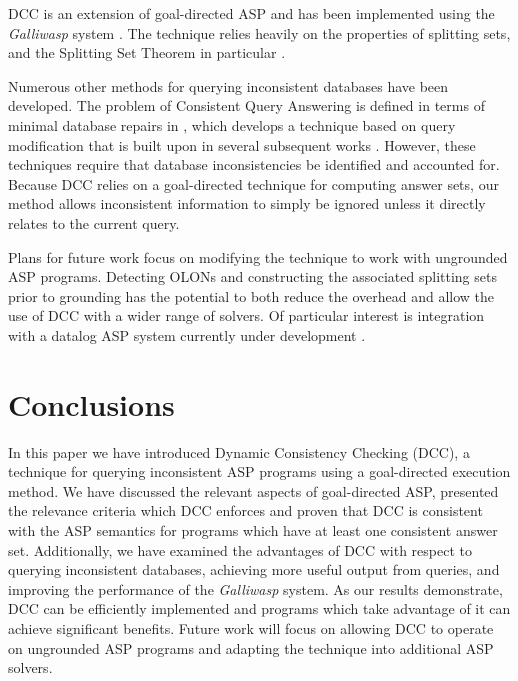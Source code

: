\documentclass{new_tlp}
\begin{document}
DCC is an extension of goal-directed ASP \cite{goalasp} and has been implemented
using the \textit{Galliwasp} system \cite{galliwasp}. The technique relies 
heavily on the properties of splitting sets, and the Splitting Set Theorem in 
particular \cite{splitting}.

Numerous other methods for querying inconsistent databases have been developed. 
The problem of Consistent Query Answering is defined in terms of minimal 
database repairs in \cite{arenas1999}, which develops a technique based on 
query modification that is built upon in several subsequent works 
\cite{celle2000,arenas2003}. 
However, these techniques require that database inconsistencies be identified 
and accounted for. Because DCC relies on a goal-directed technique for 
computing answer sets, our method allows inconsistent information to simply be 
ignored unless it directly relates to the current query.

Plans for future work focus on modifying the technique to work with ungrounded 
ASP programs. Detecting OLONs and constructing the associated splitting sets 
prior to grounding has the potential to both reduce the overhead and allow the 
use of DCC with a wider range of solvers. Of particular interest is integration 
with a datalog ASP system currently under development \cite{elmer}.


\section{Conclusions} \label{sec:conclusions}

In this paper we have introduced Dynamic Consistency Checking (DCC), a 
technique for querying inconsistent ASP programs using a goal-directed 
execution method. We have discussed the relevant aspects of goal-directed ASP, 
presented the relevance criteria which DCC enforces and proven that DCC is 
consistent with the ASP semantics for programs which have at least one 
consistent answer set. Additionally, we have examined the advantages of DCC 
with respect to querying inconsistent databases, achieving more useful output 
from queries, and improving the performance of the \textit{Galliwasp} system. 
As our results demonstrate, DCC can be efficiently implemented and programs 
which take advantage of it can achieve significant benefits. Future work will 
focus on allowing DCC to operate on ungrounded ASP programs and adapting the 
technique into additional ASP solvers.



\end{document}
